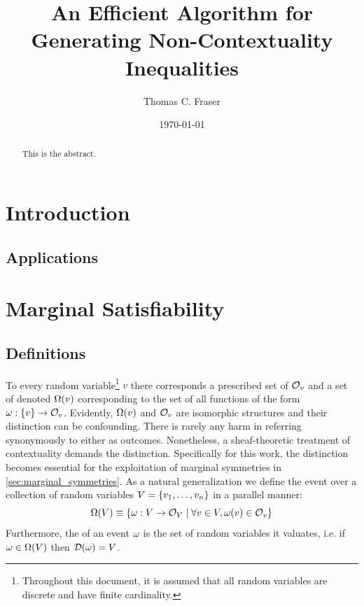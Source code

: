 \documentclass[aps, 10pt, english, twoside, twocolumn, pra, nofootinbib, tightenlines, longbibliography, superscriptaddress]{revtex4-1}
\begin{document}
    \title{
    An Efficient Algorithm for Generating Non-Contextuality Inequalities
    }
    \author{Thomas C. Fraser}
    \date{\today}
    \begin{abstract}
        This is the abstract.
    \end{abstract}
    \maketitle
    \tableofcontents

    \section{Introduction}
    \subsection{Applications}

    \section{Marginal Satisfiability}
    \subsection{Definitions}
    To every random variable\footnote{Throughout this document, it is assumed that all random variables are discrete and have finite cardinality.} $v$ there corresponds a prescribed set of  $\mathcal{O}_{v}$ and a set of  denoted $\events{v}$ corresponding to the set of all functions of the form $\w : \bc{v} \to \outcomes{v}$. Evidently, $\events{v}$ and $\mathcal{O}_{v}$ are isomorphic structures and their distinction can be confounding. There is rarely any harm in referring synonymously to either as outcomes. Nonetheless, a sheaf-theoretic treatment of contextuality \cite{Abramsky_2011} demands the distinction. Specifically for this work, the distinction becomes essential for the exploitation of marginal symmetries in \cref{sec:marginal_symmetries}. As a natural generalization we define the event over a collection of random variables $V = \bc{v_1, \ldots, v_n}$ in a parallel manner:
    \[ \events{V} \defined \bc{\w : V \to \outcomes{V} \mid \forall v \in V, \w\br{v} \in \outcomes{v}} \]
    Furthermore, the  of an event $\omega$ is the set of random variables it valuates, i.e. if $\w \in \events{V}$ then $\domain{\w} = V$.
\end{document}
